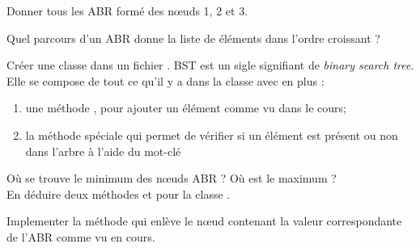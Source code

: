 \documentclass[a4paper,12pt,french]{article}
\begin{document}

\begin{exercice}
Donner tous les ABR formé des n\oe uds 1, 2 et 3.
\end{exercice}


\begin{exercice}
Quel parcours d'un ABR donne la liste de éléments dans l'ordre croissant ?
\end{exercice}

\begin{exercice}
Créer une classe  dans un fichier . BST est un sigle signifiant de \textit{binary search tree}.\\
Elle se compose de tout ce qu'il y a dans la classe  avec en plus :
\begin{enumerate}[--]
	\item une méthode , pour ajouter un élément comme vu dans le cours;
    \item la méthode spéciale  qui permet de vérifier si un élément est présent ou non dans l'arbre à l'aide du mot-clé 
\end{enumerate}
\end{exercice}

\begin{exercice}
Où se trouve le minimum des n\oe uds ABR ? Où est le maximum ?\\
En déduire deux méthodes  et  pour la classe .
\end{exercice}

\begin{exercice} 
Implementer la méthode  qui enlève le n\oe ud contenant la valeur correspondante de l'ABR comme vu en cours.
\end{exercice}
\end{document}
